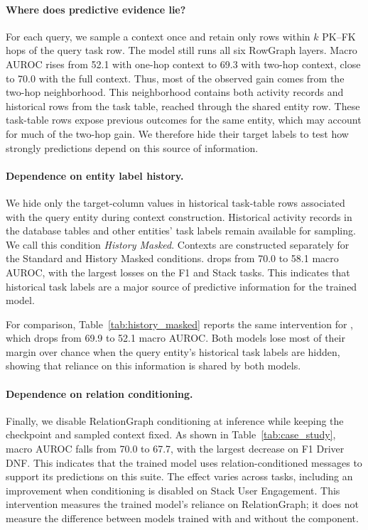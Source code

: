 \paragraph{Where does predictive evidence lie?}
For each query, we sample a context once and retain only rows within $k$
PK--FK hops of the query task row. The model still runs all six RowGraph
layers. Macro AUROC rises from 52.1 with one-hop context to 69.3 with
two-hop context, close to 70.0 with the full context. Thus, most of the
observed gain comes from the two-hop neighborhood. This neighborhood
contains both activity records and historical rows from the task table,
reached through the shared entity row. These task-table rows expose previous
outcomes for the same entity, which may account for much of the two-hop
gain. We therefore hide their target labels to test how strongly predictions
depend on this source of information.

\paragraph{Dependence on entity label history.}
We hide only the target-column values in historical task-table rows
associated with the query entity during context construction. Historical
activity records in the database tables and other entities' task labels
remain available for sampling. We call this condition \emph{History Masked}.
Contexts are constructed separately for the Standard and History Masked
conditions. \model{} drops from 70.0 to 58.1 macro AUROC, with the largest
losses on the F1 and Stack tasks. This indicates that historical task labels
are a major source of predictive information for the trained model.

For comparison, Table~\ref{tab:history_masked} reports the same intervention
for \RT{}, which drops from 69.9
to 52.1 macro AUROC. Both models lose most of their margin over chance when
the query entity's historical task labels are hidden, showing that reliance
on this information is shared by both models.

\paragraph{Dependence on relation conditioning.}
Finally, we disable RelationGraph conditioning at inference while keeping
the checkpoint and sampled context fixed. As shown in Table~\ref{tab:case_study},
macro AUROC falls from 70.0 to 67.7, with the largest decrease on F1 Driver DNF.
This indicates that the
trained model uses relation-conditioned messages to support its predictions
on this suite. The effect varies across tasks, including an improvement
when conditioning is disabled on Stack User Engagement. This intervention
measures the trained model's reliance on RelationGraph; it does not measure
the difference between models trained with and without the component.

